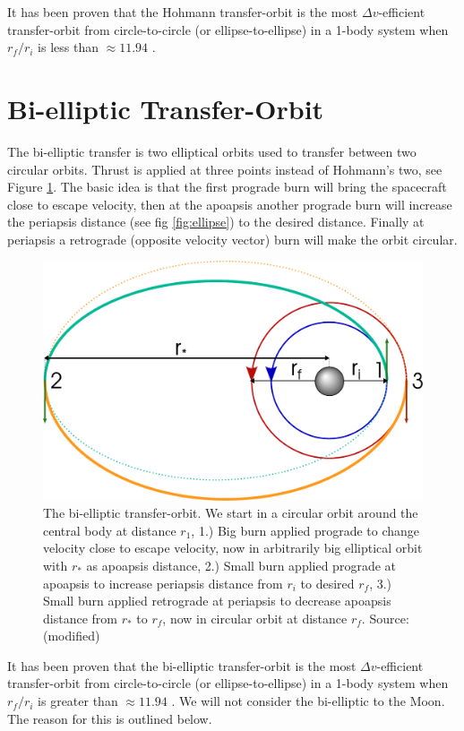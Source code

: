 It has been proven that the Hohmann transfer-orbit is the most $\Delta v$-efficient transfer-orbit from circle-to-circle (or ellipse-to-ellipse) in a 1-body system when $r_f/r_i$ is less than $\approx 11.94$ \cite{Prussing1992} \cite{Peet} \cite{Biesbroek2000}.


\section{Bi-elliptic Transfer-Orbit}
The bi-elliptic transfer is two elliptical orbits used to transfer between two circular orbits. Thrust is applied at three points instead of Hohmann's two, see Figure \ref{fig:bi-elliptical}. The basic idea is that the first prograde burn will bring the spacecraft close to escape velocity, then at the apoapsis another prograde burn will increase the periapsis distance (see fig \ref{fig:ellipse}) to the desired distance. Finally at periapsis a retrograde (opposite velocity vector) burn will make the orbit circular.

\begin{figure}[ht!]
\centering
\includegraphics[scale=0.53]{fig/bi-elliptic.pdf}
\caption{The bi-elliptic transfer-orbit. We start in a circular orbit around the central body at distance $r_1$, 1.) Big burn applied prograde to change velocity close to escape velocity, now in arbitrarily big elliptical orbit with $r_*$ as apoapsis distance, 2.) Small burn applied prograde at apoapsis to increase periapsis distance from $r_i$ to desired $r_f$, 3.) Small burn applied retrograde at periapsis to decrease apoapsis distance from $r_*$ to $r_f$, now in circular orbit at distance $r_f$. Source: \cite{fig-bi-elliptical} (modified)}
\label{fig:bi-elliptical}
\end{figure}
It has been proven that the bi-elliptic transfer-orbit is the most $\Delta v$-efficient transfer-orbit from circle-to-circle (or ellipse-to-ellipse) in a 1-body system when $r_f/r_i$ is greater than $\approx 11.94$ \cite{Prussing1992} \cite{Peet}. We will not consider the bi-elliptic to the Moon. The reason for this is outlined below.

